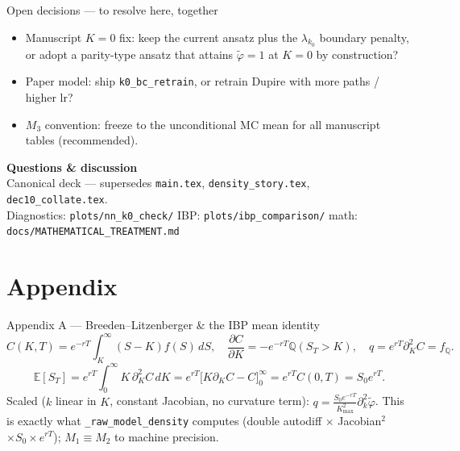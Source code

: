 \documentclass[aspectratio=169,11pt]{beamer}
\newcommand{\gold}[1]{{\color{ntugold}#1}}
\begin{document}
\begin{frame}{Open decisions --- to resolve here, together}
  \begin{itemize}
    \item \gold{Manuscript $K=0$ fix:} keep the current ansatz plus the $\lambda_{k_0}$ boundary penalty,
          or adopt a parity-type ansatz that attains $\tilde\varphi=1$ at $K=0$ by construction?
    \item \gold{Paper model:} ship \texttt{k0\_bc\_retrain}, or retrain Dupire with more paths / higher lr?
    \item \gold{$M_3$ convention:} freeze to the unconditional MC mean for all manuscript tables (recommended).
  \end{itemize}
\end{frame}

\begin{frame}{}
  \begin{center}
    \vspace{1.6cm}
    {\Huge\bfseries\color{white} Questions \& discussion}\\[0.6em]
    {\normalsize\color{ntugold}
      Canonical deck --- supersedes \texttt{main.tex}, \texttt{density\_story.tex}, \texttt{dec10\_collate.tex}.}\\[0.3em]
    {\footnotesize\color{white}
      Diagnostics: \texttt{plots/nn\_k0\_check/} \;\textbar\; IBP: \texttt{plots/ibp\_comparison/}
      \;\textbar\; math: \texttt{docs/MATHEMATICAL\_TREATMENT.md}}
  \end{center}
\end{frame}

\appendix
\section{Appendix}

\begin{frame}{Appendix A --- Breeden--Litzenberger \& the IBP mean identity}
  \small
  \[
    C(K,T)=e^{-rT}\!\int_K^\infty(S-K)f(S)\,dS,\quad
    \frac{\partial C}{\partial K}=-e^{-rT}\mathbb{Q}(S_T{>}K),\quad
    \boxed{q=e^{rT}\partial_K^2C=f_{\mathbb{Q}}}.
  \]
  \[
    \mathbb{E}[S_T]=e^{rT}\!\int_0^\infty K\,\partial_K^2C\,dK
      =e^{rT}\bigl[K\partial_KC-C\bigr]_0^\infty=e^{rT}C(0,T)=\boxed{S_0e^{rT}}.
  \]
  Scaled ($k$ linear in $K$, constant Jacobian, no curvature term):
  $q=\tfrac{S_0e^{-rT}}{K_{\max}^2}\partial_k^2\tilde\varphi$. This is exactly what
  \texttt{\_raw\_model\_density} computes (double autodiff $\times$ Jacobian$^2$ $\times S_0 \times e^{rT}$);
  $M_1\equiv M_2$ to machine precision.
\end{frame}
\end{document}
